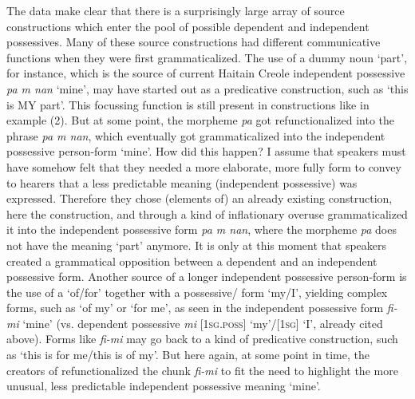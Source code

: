 \documentclass[output=paper]{langsci/langscibook}
\begin{document}
The  data make clear that there is a surprisingly large array of source constructions which enter the pool of possible dependent and independent possessives. Many of these source constructions had different communicative functions when they were first grammaticalized. The use of a dummy noun ‘part’, for instance, which is the source of current Haitain Creole independent possessive \textit{pa m nan} ‘mine’, may have started out as a predicative  construction, such as ‘this is MY part’. This focussing function is still present in constructions like in example (2). But at some point, the morpheme \textit{pa} got refunctionalized into the phrase \textit{pa m nan}, which eventually got grammaticalized into the independent possessive person-form ‘mine’. How did this happen? I assume that speakers must have somehow felt that they needed a more elaborate, more fully  form to convey to hearers that a less predictable meaning (independent possessive) was expressed. Therefore they chose (elements of) an already existing construction, here the  construction, and through a kind of inflationary overuse grammaticalized it into the independent possessive form \textit{pa m nan}, where the morpheme \textit{pa} does not have the meaning ‘part’ anymore. It is only at this moment that speakers created a grammatical opposition between a dependent and an independent possessive form. 
\newpage
Another source of a longer independent possessive person-form is the use of a  ‘of/for’ together with a possessive/ form ‘my/I’, yielding complex forms, such as ‘of my’ or ‘for me’, as seen in the  independent possessive form \textit{fi-mi} ‘mine’ (vs. dependent possessive \textit{mi} [\textsc{1sg.poss]} ‘my’/[1\textsc{sg]} ‘I’, already cited above). Forms like \textit{fi-mi} may go back to a kind of predicative construction, such as ‘this is for me/this is of my’. But here again, at some point in time, the creators of  refunctionalized the chunk \textit{fi-mi} to fit the need to highlight the more unusual, less predictable independent possessive meaning ‘mine’. 
\end{document}
